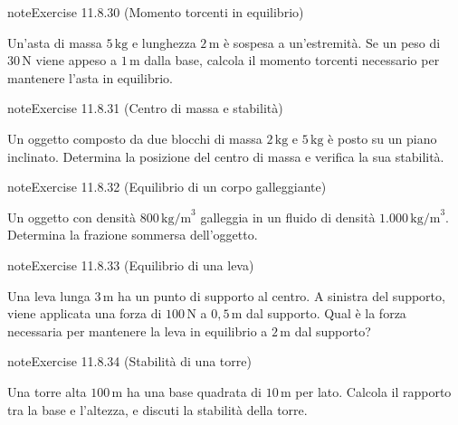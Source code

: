 \documentclass[letterpaper,10pt,italian]{jupyterBook}
\begin{document}
\begin{sphinxadmonition}{note}{Exercise 11.8.30 (Momento torcenti in equilibrio)}



\sphinxAtStartPar
Un’asta di massa \(5 \, \text{kg}\) e lunghezza \(2 \, \text{m}\) è sospesa a un’estremità. Se un peso di \(30 \, \text{N}\) viene appeso a \(1 \, \text{m}\) dalla base, calcola il momento torcenti necessario per mantenere l’asta in equilibrio.
\end{sphinxadmonition}
 \label{exercise:ch/mechanics/dynamics-problems-exercise-30}

\begin{sphinxadmonition}{note}{Exercise 11.8.31 (Centro di massa e stabilità)}



\sphinxAtStartPar
Un oggetto composto da due blocchi di massa \(2 \, \text{kg}\) e \(5 \, \text{kg}\) è posto su un piano inclinato. Determina la posizione del centro di massa e verifica la sua stabilità.
\end{sphinxadmonition}
 \label{exercise:ch/mechanics/dynamics-problems-exercise-31}

\begin{sphinxadmonition}{note}{Exercise 11.8.32 (Equilibrio di un corpo galleggiante)}



\sphinxAtStartPar
Un oggetto con densità \(800 \, \text{kg/m}^3\) galleggia in un fluido di densità \(1.000 \, \text{kg/m}^3\). Determina la frazione sommersa dell’oggetto.
\end{sphinxadmonition}
 \label{exercise:ch/mechanics/dynamics-problems-exercise-32}

\begin{sphinxadmonition}{note}{Exercise 11.8.33 (Equilibrio di una leva)}



\sphinxAtStartPar
Una leva lunga \(3 \, \text{m}\) ha un punto di supporto al centro. A sinistra del supporto, viene applicata una forza di \(100 \, \text{N}\) a \(0,5 \, \text{m}\) dal supporto. Qual è la forza necessaria per mantenere la leva in equilibrio a \(2 \, \text{m}\) dal supporto?
\end{sphinxadmonition}
 \label{exercise:ch/mechanics/dynamics-problems-exercise-33}

\begin{sphinxadmonition}{note}{Exercise 11.8.34 (Stabilità di una torre)}



\sphinxAtStartPar
Una torre alta \(100 \, \text{m}\) ha una base quadrata di \(10 \, \text{m}\) per lato. Calcola il rapporto tra la base e l’altezza, e discuti la stabilità della torre.
\end{sphinxadmonition}
 \label{exercise:ch/mechanics/dynamics-problems-exercise-34}
\end{document}
